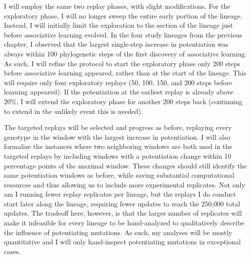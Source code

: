 I will employ the same two replay phases, with slight modifications.
For the exploratory phase, I will no longer sweep the entire early portion of the lineage. 
Instead, I will initially limit the exploration to the section of the lineage just before associative learning evolved.
In the four study lineages from the previous chapter, I observed that the largest single-step increase in potentiation was always within 100 phylogenetic steps of the first discovery of associative learning.
As such, I will refine the protocol to start the exploratory phase only 200 steps before associative learning appeared, rather than at the start of the lineage. %
This will require only four exploratory replays (50, 100, 150, and 200 steps before learning appeared). 
If the potentiation at the earliest replay is already above 20\%, I will extend the  exploratory phase for another 200 steps back (continuing to extend in the unlikely event this is needed).

The targeted replays will be selected and progress as before, replaying every genotype in the window with the largest increase in potentiation.
I will also formalize the instances where two neighboring windows are both used in the targeted replays by including windows with a potentiation change within 10 percentage points of the maximal window.
These changes should still identify the same potentiation windows as before, while saving substantial computational resources and thus allowing us to include more experimental replicates.
Not only am I running fewer replay replicates per lineage, but the replays I do conduct start later along the lineage, requiring fewer updates to reach the 250,000 total updates. 
The tradeoff here, however, is that the larger number of replicates will make it infeasible for every lineage to be hand-analyzed to qualitatively describe the influence of potentiating mutations.
As such, my analyses will be mostly quantitative and I will only hand-inspect potentiating mutations in exceptional cases. 

